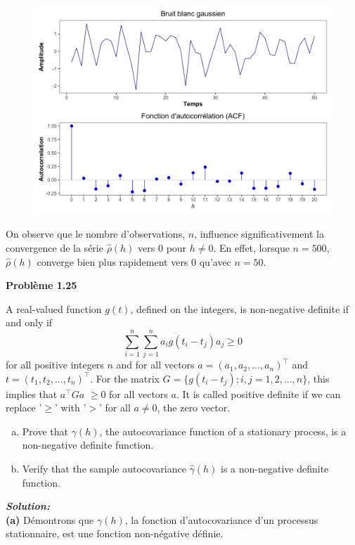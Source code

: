 \documentclass{homework}
\begin{document}
\begin{figure}[h]
    \centering
    \includegraphics[width=1\linewidth]{figure1.20b.png}
\end{figure}

On observe que le nombre d'observations, $n$, influence significativement la convergence de la série $\hat{\rho}(h)$ vers 0 pour $h \neq 0$. En effet, lorsque $n = 500$, $\hat{\rho}(h)$ converge bien plus rapidement vers 0 qu'avec $n = 50$. 

\newpage
\textbf{\Large{Problème 1.25}}

A real-valued function $g(t)$, defined on the integers, is non-negative definite if and only if
$$
\sum_{i=1}^{n}\sum_{j=1}^{n}a_ig(t_i - t_j)a_j \geq 0
$$
for all positive integers $n$ and for all vectors $a = (a_1,a_2,...,a_n)^\top$ and $t = (t_1,t_2,...,t_n)^\top$. For the matrix $G = \{g(t_i - t_j); i,j = 1,2,...,n\}$, this implies that $a^\top Ga$ $\geq 0$ for all vectors $a$. It is called positive definite if we can replace '$\geq$' with '$>$' for all $a \neq 0$, the zero vector.
\begin{enumerate}[(a)]
    \item Prove that $\gamma(h)$, the autocovariance function of a stationary process, is a non-negative definite function.
    \item Verify that the sample autocovariance $\hat{\gamma}(h)$ is a non-negative definite function.\\
\end{enumerate}

\textit{\textbf{Solution:}}\\
\textbf{(a)} Démontrons que $\gamma(h)$, la fonction d'autocovariance d'un processus stationnaire, est une fonction non-négative définie.
\end{document}
